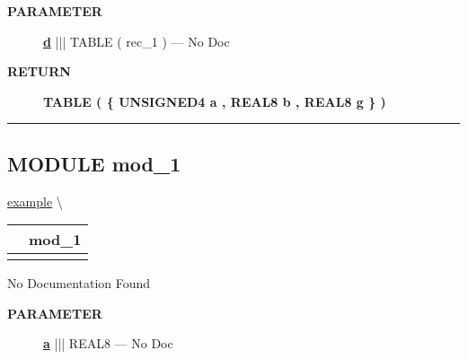 \par
\begin{description}
\item [\colorbox{tagtype}{\color{white} \textbf{\textsf{PARAMETER}}}] \textbf{\underline{d}} ||| TABLE ( rec\_1 ) --- No Doc
\end{description}







\par
\begin{description}
\item [\colorbox{tagtype}{\color{white} \textbf{\textsf{RETURN}}}] \textbf{TABLE ( \{ UNSIGNED4 a , REAL8 b , REAL8 g \} )} 
\end{description}




\rule{\linewidth}{0.5pt}
\subsection*{\textsf{\colorbox{headtoc}{\color{white} MODULE}
mod\_1}}

\hypertarget{ecldoc:example.mod_1}{}
\hspace{0pt} \hyperlink{ecldoc:example}{example} \textbackslash 

{\renewcommand{\arraystretch}{1.5}
\begin{tabularx}{\textwidth}{|>{\raggedright\arraybackslash}l|X|}
\hline
\hspace{0pt}\mytexttt{\color{red} } & \textbf{mod\_1} \\
\hline
\multicolumn{2}{|>{\raggedright\arraybackslash}X|}{\hspace{0pt}\mytexttt{\color{param} (REAL8 a)}} \\
\hline
\end{tabularx}
}

\par





No Documentation Found






\par
\begin{description}
\item [\colorbox{tagtype}{\color{white} \textbf{\textsf{PARAMETER}}}] \textbf{\underline{a}} ||| REAL8 --- No Doc
\end{description}






